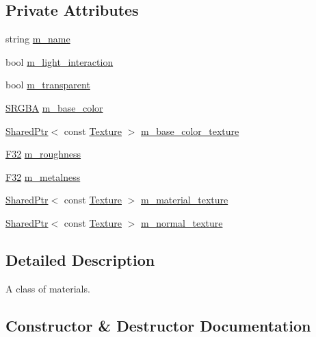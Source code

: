 \subsection*{Private Attributes}
\begin{DoxyCompactItemize}
\item 
string \hyperlink{classmage_1_1_material_a2b3e839a8ae093d53b12529d61ec6605}{m\+\_\+name}
\item 
bool \hyperlink{classmage_1_1_material_a636ddbd882e3ff2841c192c5ecbc5053}{m\+\_\+light\+\_\+interaction}
\item 
bool \hyperlink{classmage_1_1_material_abaaf4666e33f4a7952ef9d0801e3f199}{m\+\_\+transparent}
\item 
\hyperlink{structmage_1_1_s_r_g_b_a}{S\+R\+G\+BA} \hyperlink{classmage_1_1_material_a1b26923506e178f688865f79bfb93739}{m\+\_\+base\+\_\+color}
\item 
\hyperlink{namespacemage_a1e01ae66713838a7a67d30e44c67703e}{Shared\+Ptr}$<$ const \hyperlink{classmage_1_1_texture}{Texture} $>$ \hyperlink{classmage_1_1_material_ae3d40b79a275a212ea7068b0c3f8840c}{m\+\_\+base\+\_\+color\+\_\+texture}
\item 
\hyperlink{namespacemage_aa97e833b45f06d60a0a9c4fc22ae02c0}{F32} \hyperlink{classmage_1_1_material_a2a8a871ee6c18b68c33ce9cdfd23f15f}{m\+\_\+roughness}
\item 
\hyperlink{namespacemage_aa97e833b45f06d60a0a9c4fc22ae02c0}{F32} \hyperlink{classmage_1_1_material_a40b4b6c0e7b940bdf3764b21cb16fbfb}{m\+\_\+metalness}
\item 
\hyperlink{namespacemage_a1e01ae66713838a7a67d30e44c67703e}{Shared\+Ptr}$<$ const \hyperlink{classmage_1_1_texture}{Texture} $>$ \hyperlink{classmage_1_1_material_aedd606b3cc103ba756aaca9433da0794}{m\+\_\+material\+\_\+texture}
\item 
\hyperlink{namespacemage_a1e01ae66713838a7a67d30e44c67703e}{Shared\+Ptr}$<$ const \hyperlink{classmage_1_1_texture}{Texture} $>$ \hyperlink{classmage_1_1_material_adc2d9d68524a55262bd0f4832880b10b}{m\+\_\+normal\+\_\+texture}
\end{DoxyCompactItemize}


\subsection{Detailed Description}
A class of materials. 

\subsection{Constructor \& Destructor Documentation}
\hypertarget{classmage_1_1_material_a6f3ba50e9dfd73ce41473563d0ab3c20}{}\label{classmage_1_1_material_a6f3ba50e9dfd73ce41473563d0ab3c20} 
